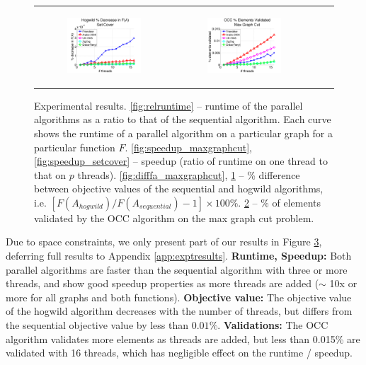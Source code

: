 \documentclass{article} %
\begin{document}
\begin{figure}[ht]
\begin{tabular}{cccc}
	  \begin{subfigure}[h]{0.32\textwidth}
	  	\includegraphics[width=125pt]{images/summary_diffFA_setcover.png}
			\caption{}
			\label{fig:difffa_setcover}
	  \end{subfigure} &
	  \begin{subfigure}[h]{0.32\textwidth}
	  	\includegraphics[width=125pt]{images/summary_validated_maxgraphcut.png}
			\caption{}
			\label{fig:validated_maxgraphcut}
	  \end{subfigure} \\
  \end{tabular}
  \caption{\footnotesize Experimental results.
  \ref{fig:relruntime} -- runtime of the parallel algorithms as a ratio to that of the sequential algorithm. Each curve shows the runtime of a parallel algorithm on a particular graph for a particular function $F$.
  \ref{fig:speedup_maxgraphcut}, \ref{fig:speedup_setcover} -- speedup (ratio of runtime on one thread to that on $p$ threads).
  \ref{fig:difffa_maxgraphcut}, \ref{fig:difffa_setcover} -- \% difference between objective values of the sequential and hogwild algorithms, i.e. $[F(A_{hogwild}) / F(A_{sequential}) - 1] \times 100\%$.
  \ref{fig:validated_maxgraphcut} -- \% of elements validated by the OCC algorithm on the max graph cut problem.
  }
\label{fig:results_quality}
\end{figure}


Due to space constraints, we only present part of our results in Figure \ref{fig:results_quality}, deferring full results to Appendix \ref{app:exptresults}.
\textbf{Runtime, Speedup:} Both parallel algorithms are faster than the sequential algorithm with three or more threads, and show good speedup properties as more threads are added ($\sim$ 10x or more for all graphs and both functions).
\textbf{Objective value:} The objective value of the hogwild algorithm decreases with the number of threads, but differs from the sequential objective value by less than $0.01\%$.
\textbf{Validations:} The OCC algorithm validates more elements as threads are added, but less than 0.015\% are validated with 16 threads, which has negligible effect on the runtime / speedup.
\end{document}
